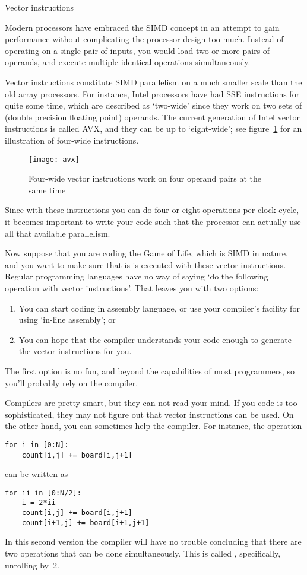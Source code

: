  {Vector instructions}
\label{sec:sse}

Modern processors have embraced the \ac{SIMD} concept in an attempt to
gain performance without complicating the processor design too much.
Instead of operating on a single pair of inputs, you would load two 
or more pairs of operands,
and execute multiple identical operations simultaneously.

Vector instructions constitute \ac{SIMD} parallelism on a much smaller
scale than the old array processors. For instance, Intel processors
have had \acf{SSE} instructions for quite some time, which are
described as `two-wide' since they work on two sets of 
(double precision floating point) operands.  The
current generation of Intel vector instructions is called \acf{AVX},
and they can be up to `eight-wide'; see figure~\ref{fig:avx}
for an illustration of four-wide instructions.
\begin{figure}[ht]
  \texttt{[image: avx]}
  \caption{Four-wide vector instructions work on four operand pairs at the same time}
  \label{fig:avx}
\end{figure}
Since with these instructions you can do four or eight operations per
clock cycle, it becomes important to write your code such that the
processor can actually use all that available parallelism.

Now suppose that you are coding the Game of Life, which is \ac{SIMD} in nature,
and you want to make sure that is is executed with these vector instructions.
Regular programming languages have no way of saying `do the following
operation with vector instructions'. That leaves you with two options:
\begin{enumerate}
\item You can start coding in assembly language, or use your
  compiler's facility for using `in-line assembly'; or
\item You can hope that the compiler understands your code enough to generate
  the vector instructions for you.
\end{enumerate}
The first option is no fun, and beyond the capabilities of most programmers,
so you'll probably rely on the compiler.

Compilers are pretty smart, but they can not read your mind. If you code is too
sophisticated, they may not figure out that vector instructions can be used.
On the other hand, you can sometimes help the compiler. For instance,
the operation
\begin{verbatim}
for i in [0:N]:
    count[i,j] += board[i,j+1]
\end{verbatim}
can be written as
\begin{verbatim}
for ii in [0:N/2]:
    i = 2*ii
    count[i,j] += board[i,j+1]
    count[i+1,j] += board[i+1,j+1]
\end{verbatim}
In this second version the compiler will have no trouble concluding
that there are two operations that can be done simultaneously. This is
called , specifically, unrolling by~2.

